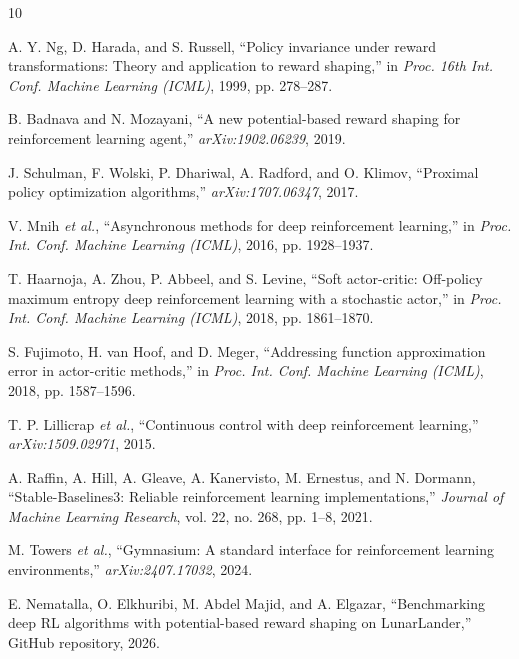 \documentclass[conference,10pt]{IEEEtran}
\begin{document}
\balance
\begin{thebibliography}{10}

A. Y. Ng, D. Harada, and S. Russell, ``Policy invariance under reward transformations: Theory and application to reward shaping,'' in \emph{Proc. 16th Int. Conf. Machine Learning (ICML)}, 1999, pp. 278--287.

B. Badnava and N. Mozayani, ``A new potential-based reward shaping for reinforcement learning agent,'' \emph{arXiv:1902.06239}, 2019.

J. Schulman, F. Wolski, P. Dhariwal, A. Radford, and O. Klimov, ``Proximal policy optimization algorithms,'' \emph{arXiv:1707.06347}, 2017.

V. Mnih \emph{et al.}, ``Asynchronous methods for deep reinforcement learning,'' in \emph{Proc. Int. Conf. Machine Learning (ICML)}, 2016, pp. 1928--1937.

T. Haarnoja, A. Zhou, P. Abbeel, and S. Levine, ``Soft actor-critic: Off-policy maximum entropy deep reinforcement learning with a stochastic actor,'' in \emph{Proc. Int. Conf. Machine Learning (ICML)}, 2018, pp. 1861--1870.

S. Fujimoto, H. van Hoof, and D. Meger, ``Addressing function approximation error in actor-critic methods,'' in \emph{Proc. Int. Conf. Machine Learning (ICML)}, 2018, pp. 1587--1596.

T. P. Lillicrap \emph{et al.}, ``Continuous control with deep reinforcement learning,'' \emph{arXiv:1509.02971}, 2015.

A. Raffin, A. Hill, A. Gleave, A. Kanervisto, M. Ernestus, and N. Dormann, ``Stable-Baselines3: Reliable reinforcement learning implementations,'' \emph{Journal of Machine Learning Research}, vol. 22, no. 268, pp. 1--8, 2021.

M. Towers \emph{et al.}, ``Gymnasium: A standard interface for reinforcement learning environments,'' \emph{arXiv:2407.17032}, 2024.

E. Nematalla, O. Elkhuribi, M. Abdel Majid, and A. Elgazar, ``Benchmarking deep RL algorithms with potential-based reward shaping on LunarLander,'' GitHub repository, 2026.

\end{thebibliography}
\end{document}
